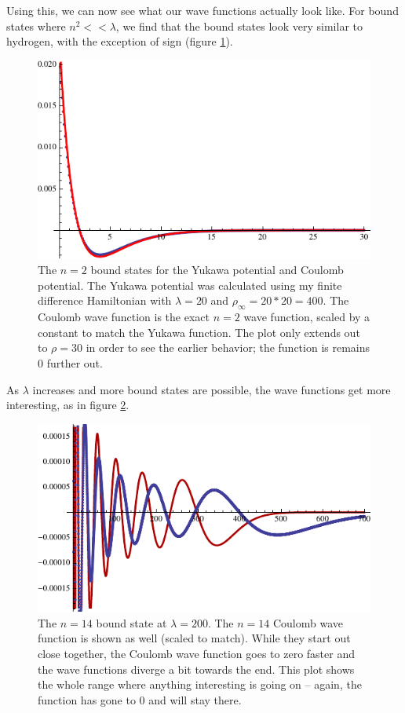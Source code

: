 \documentclass[12pt,twoside]{reedthesis}
\begin{document}
Using this, we can now see what our wave functions actually look like. For bound states where $n^2 << \lambda$, we find that the bound states look very similar to hydrogen, with the exception of sign (figure \ref{fig:hyd-yukawa}).
\begin{figure}[h]
\centering
\includegraphics{Figures/n2hydyukawa}
\caption{The $n = 2$ bound states for the Yukawa potential and Coulomb potential. The Yukawa potential was calculated using my finite difference Hamiltonian with $\lambda = 20$ and  $\rho_{\infty} = 20*20 = 400$. The Coulomb wave function is the exact $n=2$ wave function, scaled by a constant to match the Yukawa function. The plot only extends out to $\rho = 30$ in order to see the earlier behavior; the function is remains 0 further out.}
\label{fig:hyd-yukawa}
\end{figure}
As $\lambda$ increases and more bound states are possible, the wave functions get more interesting, as in figure \ref{fig:largebound}.
\begin{figure}[h]
\centering
\includegraphics{Figures/hyukawa14}
\caption{The $n=14$ bound state at $\lambda = 200$. The $n=14$ Coulomb wave function is shown as well (scaled to match). While they start out close together, the Coulomb wave function goes to zero faster and the wave functions diverge a bit towards the end. This plot shows the whole range where anything interesting is going on -- again, the function has gone to 0 and will stay there.}
\label{fig:largebound}
\end{figure}
\end{document}
